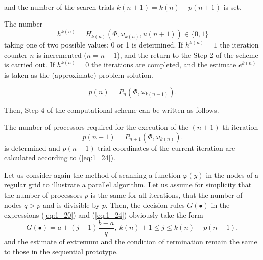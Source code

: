 \begin{description}
{\begin{equation}
\begin{gathered}
\end{gathered}
\end{equation}
and the number of the search trials $k(n+1)=k(n)+p(n+1)$  is set.}
\item[\textbf{Step 5}]{The number 
\begin{equation}
\label{eq:1_25}
h^{k(n)}=H_{k(n)}(\Phi,\omega_{k(n)},u(n+1))\in \{0,1\}
\end{equation}
taking one of two possible values: 0 or 1 is determined. If $h^{k(n)}=1$ the iteration counter $n$ is incremented ($n=n+1$), and the return to the Step 2 of the scheme is carried out. If $h^{k(n)}=0$ the  iterations are completed, and the estimate $e^{k(n)}$  is taken as the (approximate) problem solution.}
\end{description}
\begin{displaymath}
p(n)= P_n(\Phi,\omega_{k(n-1)}).
\end{displaymath}

Then, Step 4 of the computational scheme can be written as follows. 
\begin{description}
\item[\textbf{Step 4}]{The number of processors required for the execution of the  $(n+1)$-th iteration 
\begin{displaymath}
p(n+1)= P_{n+1}(\Phi,\omega_{k(n)}).
\end{displaymath}
is determined and $p(n+1)$  trial coordinates of the current iteration are calculated according to (\ref{eq:1_24}).}
\end{description}

Let us consider again the method of scanning  a function $\varphi(y)$ in the nodes of a regular grid to illustrate a parallel algorithm. Let us assume for simplicity that the number of processors $p$ is the same for all iterations, that the number of nodes $q>p$  and is divisible by $p$. Then, the decision rules $G(\bullet )$  in the expressions (\ref{eq:1_20}) and (\ref{eq:1_24})  obviously take the form 
\begin{displaymath}
G(\bullet )=a+(j-1)\frac{b-a}{q},\ k(n)+1\leq j\leq k(n)+p(n+1),
\end{displaymath}
and the estimate of extremum and the condition of termination remain the same to those in the sequential prototype. 

